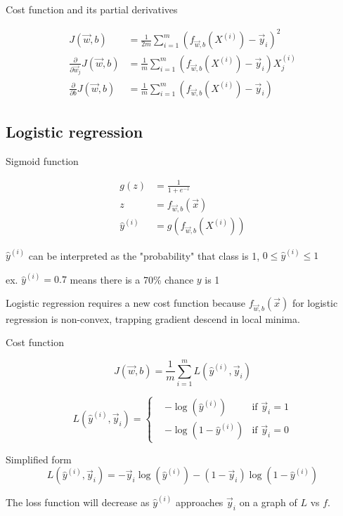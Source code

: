 \documentclass[12pt]{article}
\begin{document}
Cost function and its partial derivatives

\begin{align*}
    J(\vec{w},b) &= \frac{1}{2m} \sum_{i=1}^{m} (f_{\vec{w},b}(X^{(i)}) - \vec{y}_i)^2\\
    \frac{\partial}{\partial \vec{w}_j} J(\vec{w},b) &= \frac{1}{m} \sum_{i=1}^{m} (f_{\vec{w},b}(X^{(i)}) - \vec{y}_i) X_j^{(i)}\\
    \frac{\partial}{\partial b} J(\vec{w},b) &= \frac{1}{m} \sum_{i=1}^{m} (f_{\vec{w},b}(X^{(i)}) - \vec{y}_i)
\end{align*}

\subsection{Logistic regression}

Sigmoid function

\begin{align*}
    g(z) &= \frac{1}{1 + e^{-z}}\\
    z &= f_{\vec{w},b}(\vec{x})\\
    \hat{y}^{(i)} &= g(f_{\vec{w},b}(X^{(i)}))
\end{align*}

$\hat{y}^{(i)}$ can be interpreted as the "probability" that class is 1, $0 \leq \hat{y}^{(i)} \leq 1$

ex. $\hat{y}^{(i)} = 0.7$ means there is a 70\% chance $y$ is 1

Logistic regression requires a new cost function because $f_{\vec{w},b}(\vec{x})$ for logistic regression is non-convex, trapping gradient descend in local minima.

Cost function

\[ J(\vec{w},b) = \frac{1}{m} \sum_{i=1}^{m} L(\hat{y}^{(i)},\vec{y}_i) \]

\begin{equation*}
L(\hat{y}^{(i)},\vec{y}_i) = 
  \left\{
    \begin{aligned}
      & -\log(\hat{y}^{(i)}) & \text{if } \vec{y}_i = 1 \\
      & -\log(1 - \hat{y}^{(i)}) & \text{if } \vec{y}_i = 0
    \end{aligned}
  \right.
\end{equation*}

Simplified form
\[ L(\hat{y}^{(i)}, \vec{y}_i) = -\vec{y}_i \log(\hat{y}^{(i)}) - (1 - \vec{y}_i) \log (1 - \hat{y}^{(i)}) \]

The loss function will decrease as $\hat{y}^{(i)}$ approaches $\vec{y}_i$ on a graph of $L$ vs $f$.
\end{document}
